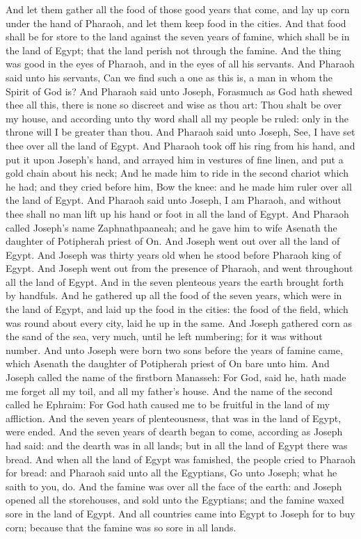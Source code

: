 \begin{biblechapter}
\verse And let them gather all the food of those good years that come, and lay up corn under the hand of Pharaoh, and let them keep food in the cities.
\verse And that food shall be for store to the land against the seven years of famine, which shall be in the land of Egypt; that the land perish not through the famine.
\verse And the thing was good in the eyes of Pharaoh, and in the eyes of all his servants.
\verse And Pharaoh said unto his servants, Can we find such a one as this is, a man in whom the Spirit of God is?
\verse And Pharaoh said unto Joseph, Forasmuch as God hath shewed thee all this, there is none so discreet and wise as thou art:
\verse Thou shalt be over my house, and according unto thy word shall all my people be ruled: only in the throne will I be greater than thou.
 And Pharaoh said unto Joseph, See, I have set thee over all the land of Egypt.
\verse And Pharaoh took off his ring from his hand, and put it upon Joseph's hand, and arrayed him in vestures of fine linen, and put a gold chain about his neck;
\verse And he made him to ride in the second chariot which he had; and they cried before him, Bow the knee: and he made him ruler over all the land of Egypt.
\verse And Pharaoh said unto Joseph, I am Pharaoh, and without thee shall no man lift up his hand or foot in all the land of Egypt.
\verse And Pharaoh called Joseph's name Zaphnathpaaneah; and he gave him to wife Asenath the daughter of Potipherah priest of On. And Joseph went out over all the land of Egypt.
\verse And Joseph was thirty years old when he stood before Pharaoh king of Egypt. And Joseph went out from the presence of Pharaoh, and went throughout all the land of Egypt.
\verse And in the seven plenteous years the earth brought forth by handfuls.
\verse And he gathered up all the food of the seven years, which were in the land of Egypt, and laid up the food in the cities: the food of the field, which was round about every city, laid he up in the same.
\verse And Joseph gathered corn as the sand of the sea, very much, until he left numbering; for it was without number.
\verse And unto Joseph were born two sons before the years of famine came, which Asenath the daughter of Potipherah priest of On bare unto him.
\verse And Joseph called the name of the firstborn Manasseh: For God, said he, hath made me forget all my toil, and all my father's house.
\verse And the name of the second called he Ephraim: For God hath caused me to be fruitful in the land of my affliction.
\verse And the seven years of plenteousness, that was in the land of Egypt, were ended.
\verse And the seven years of dearth began to come, according as Joseph had said: and the dearth was in all lands; but in all the land of Egypt there was bread.
\verse And when all the land of Egypt was famished, the people cried to Pharaoh for bread: and Pharaoh said unto all the Egyptians, Go unto Joseph; what he saith to you, do.
\verse And the famine was over all the face of the earth: and Joseph opened all the storehouses, and sold unto the Egyptians; and the famine waxed sore in the land of Egypt.
\verse And all countries came into Egypt to Joseph for to buy corn; because that the famine was so sore in all lands.
\end{biblechapter}

